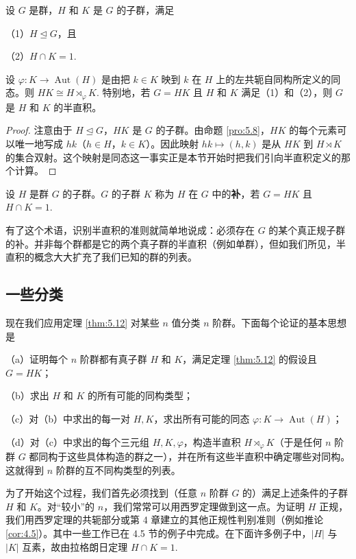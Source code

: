 \begin{theorem}\label{thm:5.12}
设 \(G\) 是群，\(H\) 和 \(K\) 是 \(G\) 的子群，满足

（1）\(H \trianglelefteq G\)，且

（2）\(H \cap K = 1\).

设 \(\varphi : K \to \operatorname{Aut}(H)\) 是由把 \(k \in K\) 映到 \(k\) 在 \(H\) 上的左共轭自同构所定义的同态。则 \(HK \cong H \rtimes_\varphi K\). 特别地，若 \(G = HK\) 且 \(H\) 和 \(K\) 满足（1）和（2），则 \(G\) 是 \(H\) 和 \(K\) 的半直积。
\end{theorem}

\begin{proof}
注意由于 \(H \trianglelefteq G\)，\(HK\) 是 \(G\) 的子群。由命题 \ref{pro:5.8}，\(HK\) 的每个元素可以唯一地写成 \(hk\)（\(h \in H\)，\(k \in K\)）。因此映射 \(hk \mapsto (h, k)\) 是从 \(HK\) 到 \(H \rtimes K\) 的集合双射。这个映射是同态这一事实正是本节开始时把我们引向半直积定义的那个计算。
\end{proof}

\begin{definition}
设 \(H\) 是群 \(G\) 的子群。\(G\) 的子群 \(K\) 称为 \(H\) 在 \(G\) 中的\textbf{补}，若 \(G = HK\) 且 \(H \cap K = 1\).
\end{definition}

有了这个术语，识别半直积的准则就简单地说成：必须存在 \(G\) 的某个真正规子群的补。并非每个群都是它的两个真子群的半直积（例如单群），但如我们所见，半直积的概念大大扩充了我们已知的群的列表。

\subsection*{一些分类}

现在我们应用定理 \ref{thm:5.12} 对某些 \(n\) 值分类 \(n\) 阶群。下面每个论证的基本思想是

（a）证明每个 \(n\) 阶群都有真子群 \(H\) 和 \(K\)，满足定理 \ref{thm:5.12} 的假设且 \(G = HK\)；

（b）求出 \(H\) 和 \(K\) 的所有可能的同构类型；

（c）对（b）中求出的每一对 \(H, K\)，求出所有可能的同态 \(\varphi : K \to \operatorname{Aut}(H)\)；

（d）对（c）中求出的每个三元组 \(H, K, \varphi\)，构造半直积 \(H \rtimes_\varphi K\)（于是任何 \(n\) 阶群 \(G\) 都同构于这些具体构造的群之一），并在所有这些半直积中确定哪些对同构。这就得到 \(n\) 阶群的互不同构类型的列表。

为了开始这个过程，我们首先必须找到（任意 \(n\) 阶群 \(G\) 的）满足上述条件的子群 \(H\) 和 \(K\)。对“较小”的 \(n\)，我们常常可以用西罗定理做到这一点。为证明 \(H\) 正规，我们用西罗定理的共轭部分或第 4 章建立的其他正规性判别准则（例如推论 \ref{cor:4.5}）。其中一些工作已在 4.5 节的例子中完成。在下面许多例子中，\(|H|\) 与 \(|K|\) 互素，故由拉格朗日定理 \(H \cap K = 1\).

